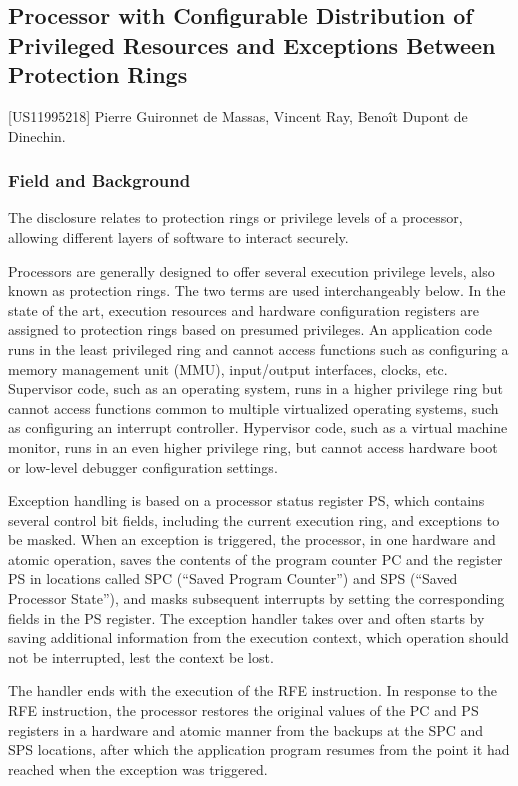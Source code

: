\subsection{Processor with Configurable Distribution of Privileged Resources and Exceptions Between Protection Rings} \label{sec:US11995218}

[US11995218] Pierre Guironnet de Massas, Vincent Ray, Benoît Dupont de Dinechin. %

\subsubsection{Field and Background}

The disclosure relates to protection rings or privilege levels of a processor, allowing different layers of software to interact securely.

Processors are generally designed to offer several execution privilege levels, also known as protection rings. The two terms are used interchangeably below.
In the state of the art, execution resources and hardware configuration registers are assigned to protection rings based on presumed privileges. An application code runs in the least privileged ring and cannot access functions such as configuring a memory management unit (MMU), input/output interfaces, clocks, etc. Supervisor code, such as an operating system, runs in a higher privilege ring but cannot access functions common to multiple virtualized operating systems, such as configuring an interrupt controller. Hypervisor code, such as a virtual machine monitor, runs in an even higher privilege ring, but cannot access hardware boot or low-level debugger configuration settings.

Exception handling is based on a processor status register PS, which contains several control bit fields, including the current execution ring, and exceptions to be masked. When an exception is triggered, the processor, in one hardware and atomic operation, saves the contents of the program counter PC and the register PS in locations called SPC (``Saved Program Counter'') and SPS (``Saved Processor State''), and masks subsequent interrupts by setting the corresponding fields in the PS register. The exception handler takes over and often starts by saving additional information from the execution context, which operation should not be interrupted, lest the context be lost.

The handler ends with the execution of the RFE instruction. In response to the RFE instruction, the processor restores the original values of the PC and PS registers in a hardware and atomic manner from the backups at the SPC and SPS locations, after which the application program resumes from the point it had reached when the exception was triggered.

